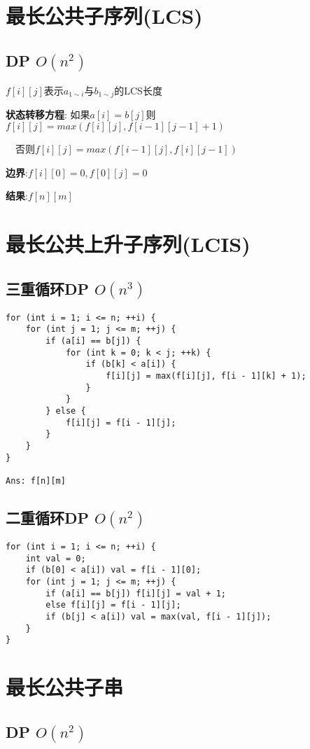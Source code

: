 \documentclass[UTF8]{ctexart}
\begin{document}
\section{最长公共子序列(LCS)}
\subsection{DP $O(n^2)$}

$f[i][j]$表示$a_{1\sim i}$与$b_{1\sim j}$的LCS长度

\textbf{状态转移方程}: 如果$a[i] = b[j]$则$f[i][j] = max(f[i][j], f[i - 1][j - 1]+1)$

\qquad\qquad\qquad\ \  否则$f[i][j] = max(f[i - 1][j], f[i][j - 1])$

\textbf{边界}:$f[i][0]=0, f[0][j]=0$

\textbf{结果}:$f[n][m]$


\section{最长公共上升子序列(LCIS)}
\subsection{三重循环DP $O(n^3)$}

\begin{lstlisting}
for (int i = 1; i <= n; ++i) {
	for (int j = 1; j <= m; ++j) {
		if (a[i] == b[j]) {
			for (int k = 0; k < j; ++k) {
				if (b[k] < a[i]) {
					f[i][j] = max(f[i][j], f[i - 1][k] + 1);
				}
			}
		} else {
			f[i][j] = f[i - 1][j];
		}
	}
}

Ans: f[n][m]
\end{lstlisting}

\subsection{二重循环DP $O(n^2)$}

\begin{lstlisting}
for (int i = 1; i <= n; ++i) {
	int val = 0;
	if (b[0] < a[i]) val = f[i - 1][0];
	for (int j = 1; j <= m; ++j) {
		if (a[i] == b[j]) f[i][j] = val + 1;
		else f[i][j] = f[i - 1][j];
		if (b[j] < a[i]) val = max(val, f[i - 1][j]);
	}
}
\end{lstlisting}


\section{最长公共子串}
\subsection{DP $O(n^2)$}
\end{document}
